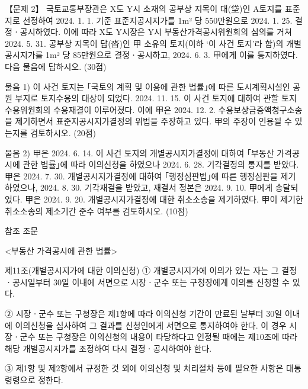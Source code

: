\begin{longquestion}{【문제 2】}
국토교통부장관은 X도 Y시 소재의 공부상 지목이 대(垈)인 A토지를 표준지로 선정하여 2024. 1. 1. 기준 표준지공시지가를 1m² 당 550만원으로 2024. 1. 25. 결정ㆍ공시하였다. 이에 따라 X도 Y시장은 Y시 부동산가격공시위원회의 심의를 거쳐 2024. 5. 31. 공부상 지목이 답(沓)인 甲 소유의 토지(이하 ‘이 사건 토지’라 함)의 개별공시지가를 1m² 당 85만원으로 결정ㆍ공시하고, 2024. 6. 3. 甲에게 이를 통지하였다. 다음 물음에 답하시오. (30점) \par
\medskip\noindent 물음 1) 이 사건 토지는 ｢국토의 계획 및 이용에 관한 법률｣에 따른 도시계획시설인 공원 부지로 토지수용의 대상이 되었다. 2024. 11. 15. 이 사건 토지에 대하여 관할 토지수용위원회의 수용재결이 이루어졌다. 이에 甲은 2024. 12. 2. 수용보상금증액청구소송을 제기하면서 표준지공시지가결정의 위법을 주장하고 있다. 甲의 주장이 인용될 수 있는지를 검토하시오. (20점) \par
\medskip\noindent 물음 2) 甲은 2024. 6. 14. 이 사건 토지의 개별공시지가결정에 대하여 ｢부동산 가격공시에 관한 법률｣에 따라 이의신청을 하였으나 2024. 6. 28. 기각결정의 통지를 받았다. 甲은 2024. 7. 30. 개별공시지가결정에 대하여 ｢행정심판법｣에 따른 행정심판을 제기하였으나, 2024. 8. 30. 기각재결을 받았고, 재결서 정본은 2024. 9. 10. 甲에게 송달되었다. 甲은 2024. 9. 20. 개별공시지가결정에 대한 취소소송을 제기하였다. 甲이 제기한 취소소송의 제소기간 준수 여부를 검토하시오. (10점) \par
\begin{framedtext}
참조 조문 \par
<부동산 가격공시에 관한 법률> \par
제11조(개별공시지가에 대한 이의신청) ① 개별공시지가에 이의가 있는 자는 그 결정ㆍ공시일부터 30일 이내에 서면으로 시장ㆍ군수 또는 구청장에게 이의를 신청할 수 있다. \par
② 시장ㆍ군수 또는 구청장은 제1항에 따라 이의신청 기간이 만료된 날부터 30일 이내에 이의신청을 심사하여 그 결과를 신청인에게 서면으로 통지하여야 한다. 이 경우 시장ㆍ군수 또는 구청장은 이의신청의 내용이 타당하다고 인정될 때에는 제10조에 따라 해당 개별공시지가를 조정하여 다시 결정ㆍ공시하여야 한다. \par
③ 제1항 및 제2항에서 규정한 것 외에 이의신청 및 처리절차 등에 필요한 사항은 대통령령으로 정한다. \par

\end{framedtext}
\end{longquestion}
